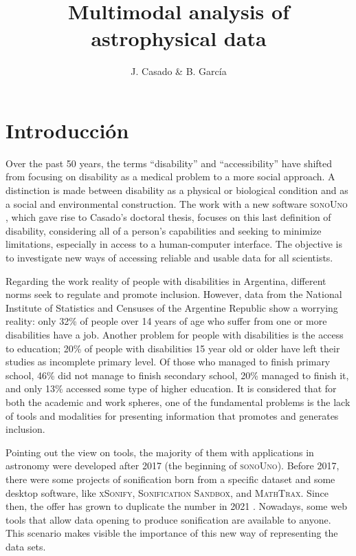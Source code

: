 \documentclass[baaa]{baaa}
\title{Multimodal analysis of astrophysical data}
\author{
J. Casado\inst{1,2}
\&
B. Garc\'{i}a\inst{1,3}
}
\institute{
Instituto de Tecnologías en Detección y Astropartículas, CNEA–CONICET–UNSAM, Argentina \and   
Instituto de Bioingenier\'{i}a, Facultad de Ingenier\'{i}a, Universidad de Mendoza, Argentina \and
Universidad Tecnol\'{o}gica Nacional, Argentina
}
\begin{document}
\maketitle

\section{Introducción}
\label{sec:intro}

Over the past 50 years, the terms ``disability'' and ``accessibility'' have shifted from focusing on disability as a medical problem to a more social approach. A distinction is made between disability as a physical or biological condition and as a social and environmental construction. The work with a new software \textsc{sonoUno} \citep{casadoJOSS2024}, which gave rise to Casado's \citep{thesiscasado} doctoral thesis, focuses on this last definition of disability, considering all of a person's capabilities and seeking to minimize limitations, especially in access to a human-computer interface. The objective is to investigate new ways of accessing reliable and usable data for all scientists.

Regarding the work reality of people with disabilities in Argentina, different norms seek to regulate and promote inclusion. However, data from the National Institute of Statistics and Censuses of the Argentine Republic \citep{indec2018} show a worrying reality: only 32\% of people over 14 years of age who suffer from one or more disabilities have a job. Another problem for people with disabilities is the access to education; 20\% of people with disabilities 15 year old or older have left their studies as incomplete primary level. Of those who managed to finish primary school, 46\% did not manage to finish secondary school, 20\% managed to finish it, and only 13\% accessed some type of higher education. It is considered that for both the academic and work spheres, one of the fundamental problems is the lack of tools and modalities for presenting information that promotes and generates inclusion.

Pointing out the view on tools, the majority of them with applications in astronomy were developed after 2017 (the beginning of \textsc{sonoUno}). Before 2017, there were some projects of sonification born from a specific dataset and some desktop software, like \textsc{xSonify}, \textsc{Sonification Sandbox}, and \textsc{MathTrax}. Since then, the offer has grown to duplicate the number in 2021 \citep{zanella2022}. Nowadays, some web tools that allow data opening to produce sonification are available to anyone. This scenario makes visible the importance of this new way of representing the data sets.
\end{document}
